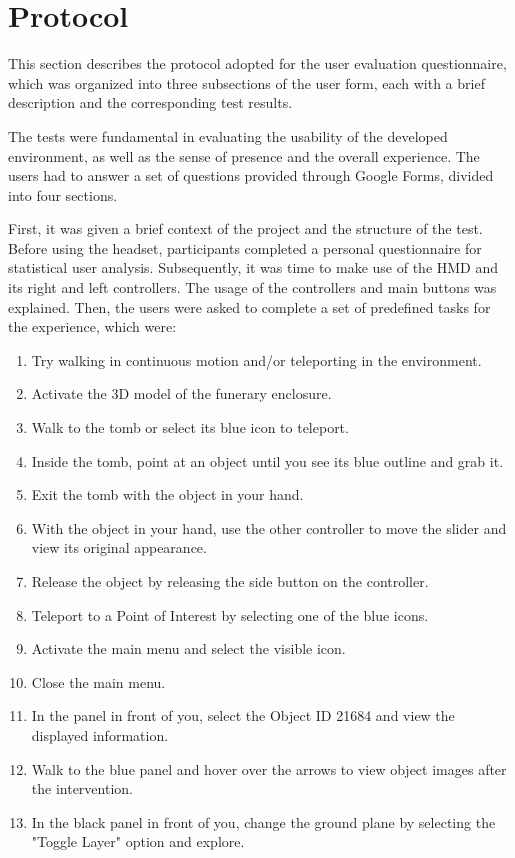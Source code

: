 \section{Protocol}
\label{sec:protocol}

This section describes the protocol adopted for the user evaluation questionnaire, which was organized into three subsections of the user form, each with a brief description and the corresponding test results.

The tests were fundamental in evaluating the usability 
of the developed environment, as well as the sense of presence 
and the overall experience. 
The users had to answer a set of questions provided through Google Forms, divided into four sections. 

First, it was given a brief context of the project and the structure of the test.
Before using the headset, participants completed a personal questionnaire for statistical user analysis. 
Subsequently, it was time to make use of the \gls{HMD} and its right and left controllers.
The usage of the controllers and main buttons was explained. Then, the users were asked to complete a set of predefined tasks for the experience, which were:

\begin{enumerate}
\item{Try walking in continuous motion and/or teleporting in the environment.}
\item{Activate the 3D model of the funerary enclosure.}
\item{Walk to the tomb or select its blue icon to teleport.}
\item{Inside the tomb, point at an object until you see its blue outline and grab it.}
\item{Exit the tomb with the object in your hand.}
\item{With the object in your hand, use the other controller to move the slider and view its original appearance.}
\item{Release the object by releasing the side button on the controller.}
\item{Teleport to a Point of Interest by selecting one of the blue icons.}
\item{Activate the main menu and select the visible icon.}
\item{Close the main menu.}
\item{In the panel in front of you, select the Object ID 21684 and view the displayed information.}
\item{Walk to the blue panel and hover over the arrows to view object images after the intervention.}
\item{In the black panel in front of you, change the ground plane by selecting the "Toggle Layer" option and explore.}
\end{enumerate}

